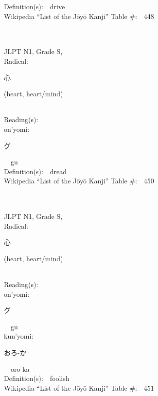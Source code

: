 \begin{multicols}{2}
Definition(s):\ \ drive \\
Wikipedia ``List of the J\=oy\=o Kanji'' Table \#:\ \ 448 \\
\ \ \\
{\fontsize{34pt}{40pt}  }\ \ \\
{JLPT N1, Grade S, \\Radical:\ \ {\begin{CJK}{UTF8}{min} 心 \end{CJK}} (heart, heart/mind) } \\
Reading(s):\ \ \\
{\hspace*{1em}}on'yomi:\ \ \\
{\hspace*{2em}}{\begin{CJK}{UTF8}{min} グ \end{CJK}}\ \ gu\ \ \\
Definition(s):\ \ dread \\
Wikipedia ``List of the J\=oy\=o Kanji'' Table \#:\ \ 450 \\
\ \ \\
{\fontsize{34pt}{40pt}  }\ \ \\
{JLPT N1, Grade S, \\Radical:\ \ {\begin{CJK}{UTF8}{min} 心 \end{CJK}} (heart, heart/mind) } \\
Reading(s):\ \ \\
{\hspace*{1em}}on'yomi:\ \ \\
{\hspace*{2em}}{\begin{CJK}{UTF8}{min} グ \end{CJK}}\ \ gu\ \ \\
{\hspace*{1em}}kun'yomi:\ \ \\
{\hspace*{2em}}{\begin{CJK}{UTF8}{min} おろ-か \end{CJK}}\ \ oro-ka\ \ \\
Definition(s):\ \ foolish \\
Wikipedia ``List of the J\=oy\=o Kanji'' Table \#:\ \ 451 \\

\end{multicols}
